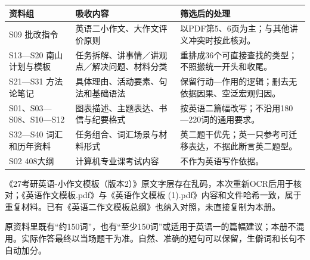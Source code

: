\documentclass[11pt,a4paper,fontset=macnew]{ctexart}
\begin{document}
\begin{longtable}{L{40mm}L{54mm}L{59mm}}\toprule
\textbf{资料组} & \textbf{吸收内容} & \textbf{筛选后的处理}\\\midrule\endhead
S09 批改指令 & 英语二小作文、大作文评价原则 & 以PDF第5、6页为主；与其他讲义冲突时按此核对。\\
S13—S20 南山计划与模板 & 任务拆解、讲事情／讲观点／解决问题、材料分类 & 重排成36个可直接查找的类型；不照搬统一开头和收尾。\\
S21—S31 方法论笔记 & 具体理由、活动要素、句法和基础语法 & 保留行动—作用的逻辑；删去无依据因果、空泛宏观归因。\\
S01、S03—S08、S10—S12 & 图表描述、主题表达、书信与纪要格式 & 按英语二篇幅改写；不沿用180—220词的通用要求。\\
S32—S40 词汇和历年资料 & 任务组合、词汇场景与材料形式 & 英二题干优先；英一只参考可迁移表达，不据此断言英二题型。\\
S02 408大纲 & 计算机专业课考试内容 & 不作为英语写作依据。\\
\bottomrule\end{longtable}
\par\vspace{4pt}{\bfseries 两项容易被忽略的来源问题}\par\nopagebreak
《27考研英语-小作文模板（版本2）》原文字层存在乱码，本次重新OCR后用于核对；《英语作文模板.pdf》与《英语作文模板 (1).pdf》内容和文件哈希一致，属于重复材料。已有《英语二作文模板总纲》也纳入对照，未直接复制为本册。

原资料里既有“约150词”，也有“至少150词”或适用于英语一的篇幅建议；本册不混用。实际作答最终以当场题干为准。自然、准确的短句可以保留，生僻词和长句不自动加分。
\end{document}
